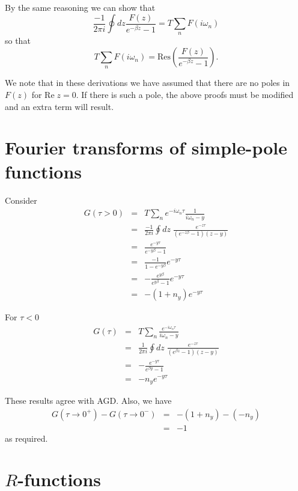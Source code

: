 By the same reasoning we can show that
\begin{equation}
\frac{-1}{2 \pi i} \oint dz \frac{F(z)}{e^{-\beta z}-1}
= T \sum_n F(i \omega_n)
\end{equation}
so that
\begin{equation}
T \sum_n F(i\omega_n) = \mathrm{Res}\left(\frac{F(z)}
{e^{-\beta z}-1}\right).
\end{equation}

We note that in these derivations we have assumed that
there are no poles in $F(z)$ for $\mathrm{Re}\;z = 0$.
If there is such a pole, the above proofs must be modified and
an extra term will result.

\section{Fourier transforms of simple-pole functions}

Consider
\begin{eqnarray}
G(\tau > 0) & = & T \sum_n e^{-i \omega_n \tau} \frac{1}{i \omega_n - y} \\
& = & \frac{-1}{2 \pi i} \oint dz\;\frac{e^{-z \tau}}{(e^{-z \beta} - 1)
(z - y)} \\
& = & \frac{e^{-y \tau}}{e^{-y \beta} - 1}  \\
& = & \frac{-1}{1 - e^{-y \beta}} e^{-y \tau} \\
& = & - \frac{e^{y\beta}}{e^{y\beta} - 1} e^{- y \tau} \\
& = & - (1 + n_y) e^{-y \tau} 
\end{eqnarray}

For $\tau < 0$
\begin{eqnarray}
G(\tau) & = & T \sum_n \frac{e^{-i \omega_n \tau}}{i\omega_n - y} \\
& = & \frac{1}{2 \pi i} \oint dz\; \frac{e^{-z \tau}}{(e^{\beta z} - 1)
(z - y)} \\
& = & - \frac{e^{-y \tau}}{e^{\beta y} - 1} \\
& = & - n_y e^{-y \tau}
\end{eqnarray}

These results agree with AGD.  Also, we have
\begin{eqnarray}
G(\tau \to 0^+) - G(\tau \to 0^-) & = & - (1 + n_y) - (- n_y) \\
& = & -1
\end{eqnarray}
as required.

\section{$R$-functions}

